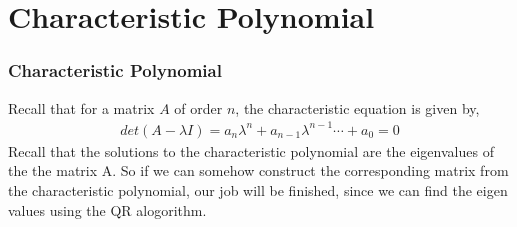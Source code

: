 \documentclass{beamer}
\providecommand{\brak}[1]{\ensuremath{\left(#1\right)}}
\theoremstyle{remark}
\providecommand{\norm}[1]{\lVert#1\rVert}
\newcommand{\myvec}[1]{\ensuremath{\begin{pmatrix}#1\end{pmatrix}}}
\let\vec\mathbf
\numberwithin{equation}{section}
\begin{document}
\section{Characteristic Polynomial}
\begin{frame}
  \frametitle{Characteristic Polynomial}
  Recall that for a matrix $A$ of order $n$, the characteristic equation is given by,
\begin{align}
  det\brak{A - \lambda I} = a_n \lambda ^n + a_{n-1} \lambda ^{n-1} \cdots + a_0 = 0
 \end{align}
 Recall that the solutions to the characteristic polynomial are the eigenvalues of the the matrix
 A. So if we can somehow construct the corresponding matrix from the characteristic polynomial,
 our job will be finished, since we can find the eigen values using the QR alogorithm.

\end{frame}
\end{document}

